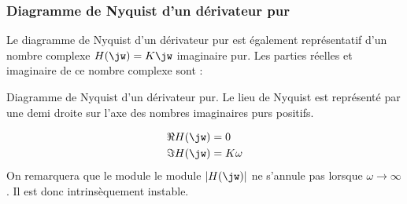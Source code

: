 \subsubsection{Diagramme de Nyquist d'un dérivateur pur}
Le diagramme de Nyquist d'un dérivateur pur est également représentatif d'un 
nombre complexe $H(\jw)=K\jw$ imaginaire pur. Les parties réelles et imaginaire
de ce nombre complexe sont :
\begin{marginfigure}
    \centering
    \resizebox{\linewidth}{!}{}
    \caption{Diagramme de Nyquist d'un dérivateur pur. Le lieu de Nyquist 
             est représenté par une demi droite sur l'axe des nombres 
             imaginaires purs positifs.\label{fig-nyquist_3}}
\end{marginfigure}
\begin{align*}
    \Re{H(\jw)}&=0\\
    \Im{H(\jw)}&=K\omega
\end{align*}
On remarquera que le module le module $|H(\jw)|$ ne s'annule pas
lorsque $\omega\to\infty$. Il est donc intrinsèquement instable.
